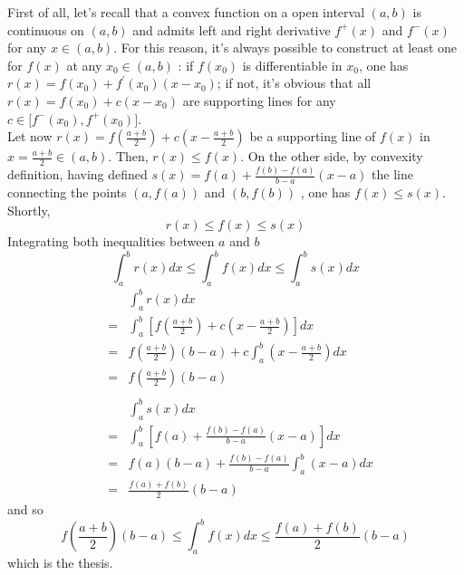 \documentclass[12pt]{article}
\begin{document}
First of all, let's recall that a convex function on a open
interval $(a,b)$ is continuous on $(a,b)$ and admits left and right
derivative $f^{+}(x)$ and $f^{-}(x)$ for any $x\in (a,b)$. For this reason,
it's always possible to construct at least one  for $f\left(
x\right) $ at any $x_{0}\in (a,b)$ : if  $f\left( x_{0}\right) $ is
differentiable in $x_{0}$, one has $r(x)=f\left( x_{0}\right) +f^{\prime
}\left( x_{0}\right) \left( x-x_{0}\right) $; if not, it's obvious that all $%
r(x)=f\left( x_{0}\right) +c\left( x-x_{0}\right) $ are supporting lines for
any $c\in \lbrack f^{-}(x_{0}),f^{+}(x_{0})]$.\\
Let now $r(x)=f\left( \frac{a+b}{2}\right) +c\left( x-\frac{a+b}{2}%
\right) $ be a supporting line of $f(x)$ in $x=\frac{a+b}{2}\in (a,b)$.
Then, $r\left( x\right) \leq f\left( x\right) $. On the other side, by
convexity definition, having defined $s\left( x\right) =f\left( a\right) +%
\frac{f(b)-f(a)}{b-a}(x-a)$ the line connecting the points $(a,f(a))$ and $%
(b,f(b))$ , one has $f(x)\leq s(x)$. Shortly,%
\[
r\left( x\right) \leq f\left( x\right) \leq s(x)
\]
Integrating both inequalities between $a$ and $b$
\[
\int_{a}^{b}r\left( x\right) dx\leq \int_{a}^{b}f\left( x\right) dx\leq
\int_{a}^{b}s(x)dx 
\]
\begin{eqnarray*}
&&\int_{a}^{b}r\left( x\right) dx \\
&=&\int_{a}^{b}\left[ f\left( \frac{a+b}{2}\right) +c\left( x-\frac{a+b}{2}%
\right) \right] dx \\
&=&f\left( \frac{a+b}{2}\right) (b-a)+c\int_{a}^{b}\left( x-\frac{a+b}{2}%
\right) dx \\
&=&f\left( \frac{a+b}{2}\right) (b-a) \\
&& \\
&&\int_{a}^{b}s(x)dx \\
&=&\int_{a}^{b}\left[ f\left( a\right) +\frac{f(b)-f(a)}{b-a}(x-a)\right] dx
\\
&=&f(a)(b-a)+\frac{f(b)-f(a)}{b-a}\int_{a}^{b}(x-a)dx \\
&=&\frac{f(a)+f(b)}{2}(b-a)
\end{eqnarray*}
and so%
\[
f\left( \frac{a+b}{2}\right) (b-a)\leq \int_{a}^{b}f\left( x\right) dx\leq 
\frac{f(a)+f(b)}{2}(b-a) 
\]
which is the thesis.
\end{document}
